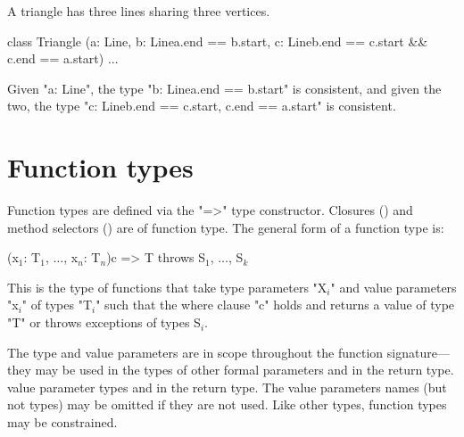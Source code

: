 \begin{example}
A triangle has three lines sharing three vertices.
\begin{xten}
class Triangle 
 (a: Line, 
  b: Line{a.end == b.start}, 
  c: Line{b.end == c.start && c.end == a.start}) 
 { ... }
\end{xten}


Given \xcd"a: Line", the type \xcd"b: Line{a.end == b.start}" is consistent,
and
given the two, the type \xcd"c: Line{b.end == c.start, c.end == a.start}"
is consistent.

\end{example}

\section{Function types}
\label{FunctionTypes}




        Function types are defined via the \xcd"=>" type
        constructor.  Closures () and method
        selectors () are of function type.
        The general form of a function type is:
\begin{xtenmath}
[X$_1$, $\dots$, X$_m$](x$_1$: T$_1$, $\dots$, x$_n$: T$_n$){c} => T
        throws S$_1$, $\dots$, S$_k$
\end{xtenmath}
        This
        is the type of functions that take type parameters
        \xcdmath"X$_i$"
        and value parameters
        \xcdmath"x$_i$"
        of types
        \xcdmath"T$_i$"
        such that the where clause \xcd"c" holds
        and returns a value of type \xcd"T" or throws
        exceptions of 
        types S$_i$.

The type and value parameters
are in scope throughout the function signature---they may be
used
in the types of other formal parameters and in the return type.
value parameter types and in the return type.
The value parameters names (but not types) may be omitted if
they are not used. 
Like other types, function types may be constrained.


